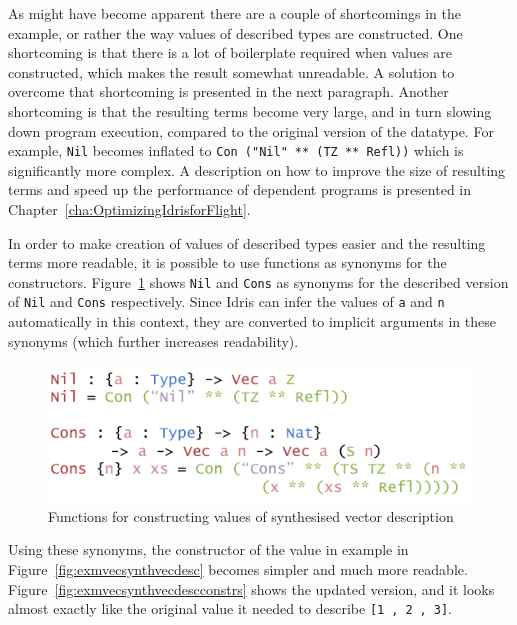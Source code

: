\documentclass{ituthesis}
\newcommand{\ttconstructor}[1]{\textcolor{constructor-color}{\texttt{#1}}}
\newcommand{\ttdec}[1]{\textcolor{declared-var-color}{\texttt{#1}}}
\newcommand{\ttvar}[1]{\textcolor{local-var-color}{\texttt{#1}}}
\newcommand{\ttliteral}[1]{\textcolor{literal-color}{\texttt{#1}}}
\theoremstyle{break}
\begin{document}
As might have become apparent there are a couple of shortcomings in the example, or rather the way values of described types are constructed.
One shortcoming is that there is a lot of boilerplate required when values are constructed, which makes the result somewhat unreadable.
A solution to overcome that shortcoming is presented in the next paragraph. Another shortcoming is that the resulting terms become very large, and in turn slowing down program execution, compared to the original
version of the datatype. For example, \ttconstructor{Nil} becomes inflated to \ttconstructor{Con~(}\ttliteral{"Nil"}~\ttconstructor{** (TZ ** Refl))} which is significantly more complex. A description on how to improve the size of resulting terms and
speed up the performance of dependent programs is presented in Chapter~\ref{cha:OptimizingIdrisforFlight}.

In order to make creation of values of described types easier and the resulting terms more readable, it is possible to use functions as synonyms for the constructors.
Figure~\ref{fig:funcconstrsynthvec} shows \ttdec{Nil} and \ttdec{Cons} as synonyms for the described version of \ttconstructor{Nil} and \ttconstructor{Cons} respectively.
Since Idris can infer the values of \ttvar{a} and \ttvar{n} automatically in this context, they are converted to implicit arguments in these synonyms (which further increases readability).

\begin{figure}[ht]
\begin{center}
    \includegraphics[scale=0.5]{Figures/VectorSynthesisedConstructors.png}
\end{center}
\caption{Functions for constructing values of synthesised vector description}
\label{fig:funcconstrsynthvec}
\end{figure}

Using these synonyms, the constructor of the value in example in Figure~\ref{fig:exmvecsynthvecdesc} becomes simpler and much more readable. Figure~\ref{fig:exmvecsynthvecdescconstrs} shows the updated version,
and it looks almost exactly like the original value it needed to describe \ttconstructor{[}\ttliteral{1}~\ttconstructor{,}~\ttliteral{2}~\ttconstructor{,}~\ttliteral{3}\ttconstructor{]}.
\end{document}
